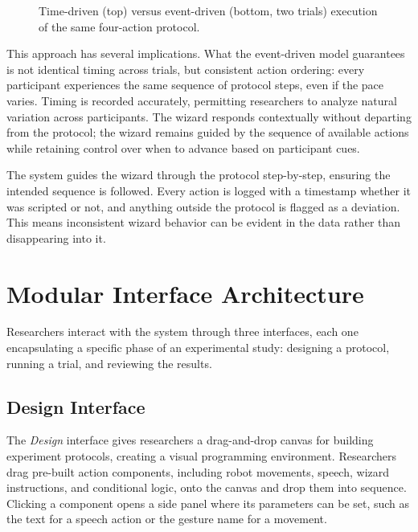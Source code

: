 \begin{figure}[htbp]
\caption{Time-driven (top) versus event-driven (bottom, two trials) execution of the same four-action protocol.}
\label{fig:event-driven-timeline}
\end{figure}

This approach has several implications. What the event-driven model guarantees is not identical timing across trials, but consistent action ordering: every participant experiences the same sequence of protocol steps, even if the pace varies. Timing is recorded accurately, permitting researchers to analyze natural variation across participants. The wizard responds contextually without departing from the protocol; the wizard remains guided by the sequence of available actions while retaining control over when to advance based on participant cues.

The system guides the wizard through the protocol step-by-step, ensuring the intended sequence is followed. Every action is logged with a timestamp whether it was scripted or not, and anything outside the protocol is flagged as a deviation. This means inconsistent wizard behavior can be evident in the data rather than disappearing into it.

\section{Modular Interface Architecture}

Researchers interact with the system through three interfaces, each one encapsulating a specific phase of an experimental study: designing a protocol, running a trial, and reviewing the results.

\subsection{Design Interface}

The \emph{Design} interface gives researchers a drag-and-drop canvas for building experiment protocols, creating a visual programming environment. Researchers drag pre-built action components, including robot movements, speech, wizard instructions, and conditional logic, onto the canvas and drop them into sequence. Clicking a component opens a side panel where its parameters can be set, such as the text for a speech action or the gesture name for a movement.

